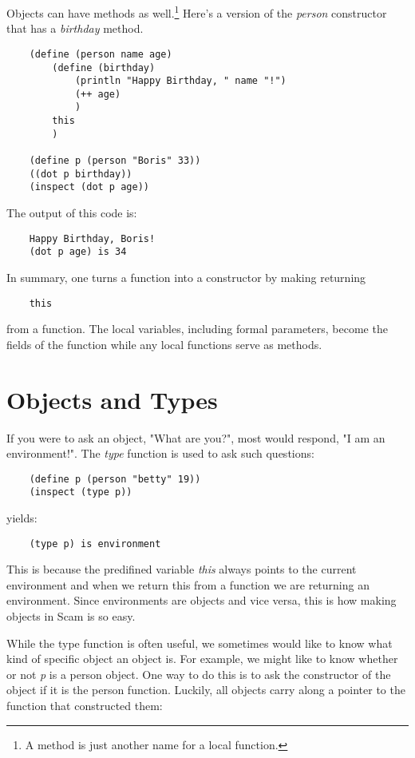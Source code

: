 Objects can have methods as well.\footnote{
A method is just another name for a local function.
}
Here's a version of the
{\it person} constructor that has a {\it birthday} method.

\begin{verbatim}
    (define (person name age)
        (define (birthday)
            (println "Happy Birthday, " name "!")
            (++ age)
            )
        this
        )
        
    (define p (person "Boris" 33))
    ((dot p birthday))
    (inspect (dot p age))
\end{verbatim}

The output of this code is:

\begin{verbatim}
    Happy Birthday, Boris!
    (dot p age) is 34
\end{verbatim}

In summary, one turns a function into a constructor by making returning

\begin{verbatim}
    this
\end{verbatim}

from a function. The local variables, including
formal parameters, become the fields of the function while
any local functions serve as methods.

\section{Objects and Types}

If you were to ask an object, "What are you?", most
would respond, "I am an environment!". The {\it type} function is
used to ask such questions:

\begin{verbatim}
    (define p (person "betty" 19))
    (inspect (type p))
\end{verbatim}

yields:

\begin{verbatim}
    (type p) is environment
\end{verbatim}

This is because the predifined variable {\it this} always points to
the current environment and when we return this from a function
we are returning an environment. Since environments are objects
and vice versa, this is how making objects in Scam is so easy.

While the type function is often useful, we sometimes 
would like to know what kind of specific object an object is.
For example, we might like to 
know whether or not {\it p} is a person object. One way to do this
is to ask the constructor of the object if it is the person function.
Luckily, all objects carry along a pointer to the function
that constructed them:

